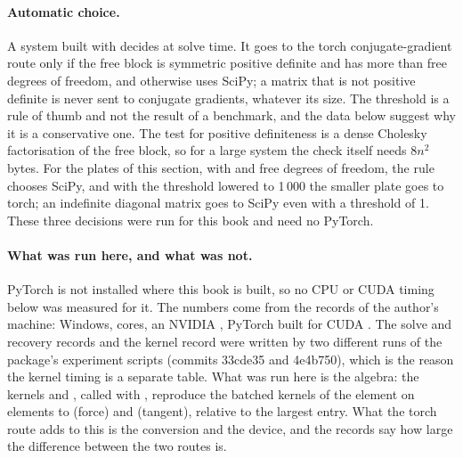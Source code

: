 \paragraph{Automatic choice.} A system built with  decides at solve time. It goes to the torch conjugate-gradient route only if the free block is symmetric positive definite and has more than \bktAutoThr{} free degrees of freedom, and otherwise uses SciPy; a matrix that is not positive definite is never sent to conjugate gradients, whatever its size. The threshold is a rule of thumb and not the result of a benchmark, and the data below suggest why it is a conservative one. The test for positive definiteness is a dense Cholesky factorisation of the free block, so for a large system the check itself needs $8n^2$ bytes. For the plates of this section, with \bktAutoSmallN{} and \bktAutoBigN{} free degrees of freedom, the rule chooses SciPy, and with the threshold lowered to 1\,000 the smaller plate goes to torch; an indefinite diagonal matrix goes to SciPy even with a threshold of 1. These three decisions were run for this book and need no PyTorch.

\paragraph{What was run here, and what was not.} PyTorch is not installed where this book is built, so no CPU or CUDA timing below was measured for it. The numbers come from the records of the author's machine: Windows, \bktCores{} cores, an NVIDIA \bktGpu, PyTorch \bktTorch{} built for CUDA \bktCuda. The solve and recovery records and the kernel record were written by two different runs of the package's experiment scripts (commits 33cde35 and 4e4b750), which is the reason the kernel timing is a separate table. What was run here is the algebra: the kernels  and , called with , reproduce the batched kernels of the element on \bktShadowNe{}  elements to \bktShadowForce{} (force) and \bktShadowTangent{} (tangent), relative to the largest entry. What the torch route adds to this is the conversion and the device, and the records say how large the difference between the two routes is.

\begin{table}[ht]
\centering\small

\caption{Linear solve of the free-dof system of a Quad4 plane-stress plate (clamped at one end, tip load): SciPy (default) against PyTorch, on the CPU and on the GPU, by conjugate gradients (Jacobi preconditioner, relative tolerance $10^{-10}$) and by the dense method (not run above $12\,000$ degrees of freedom). Each time is the minimum of three runs and includes the conversion to tensors and back. The last column is the largest relative difference to the SciPy solution. Records of the author's machine (\bktGpu), not measured for this book.}\label{tab:bk-torch-solve}
\end{table}

